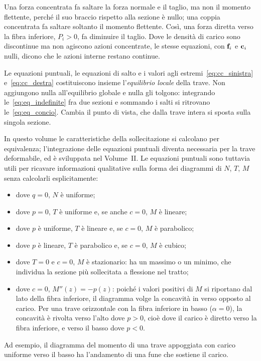 Una forza concentrata fa saltare la forza normale e il
taglio, ma non il momento flettente, perché il suo
braccio rispetto alla sezione è nullo; una coppia
concentrata fa saltare soltanto il momento flettente.
Così, una forza diretta verso la fibra inferiore,
$P_i > 0$, fa diminuire il taglio. Dove le densità di
carico sono discontinue ma non agiscono azioni
concentrate, le stesse equazioni, con $\mathbf{f}_i$ e $\mathbf{c}_i$
nulli, dicono che le azioni interne restano continue.



Le equazioni puntuali, le equazioni di salto e i
valori agli estremi~\eqref{eq:cc_sinistra}
e~\eqref{eq:cc_destra} costituiscono insieme
l'\emph{equilibrio locale} della trave. Non aggiungono
nulla all'equilibrio globale e nulla gli tolgono:
integrando le~\eqref{eq:eq_indefinite} fra due sezioni
e sommando i salti si ritrovano le~\eqref{eq:eq_concio}.
Cambia il punto di vista, che dalla trave intera si
sposta sulla singola sezione.

In questo volume le caratteristiche della sollecitazione
si calcolano per equivalenza; l'integrazione delle
equazioni puntuali diventa necessaria per la trave
deformabile, ed è sviluppata nel Volume~II. Le equazioni
puntuali sono tuttavia utili per ricavare informazioni
qualitative sulla forma dei diagrammi di $N$, $T$, $M$
senza calcolarli esplicitamente:
\begin{itemize}[nosep]
	\item dove $q = 0$, $N$ è uniforme;
	\item dove $p = 0$, $T$ è uniforme e, se anche $c = 0$,
	$M$ è lineare;
	\item dove $p$ è uniforme, $T$ è lineare e, se $c = 0$,
	$M$ è parabolico;
	\item dove $p$ è lineare, $T$ è parabolico e, se $c = 0$,
	$M$ è cubico;
	\item dove $T = 0$ e $c = 0$, $M$ è stazionario: ha un
	massimo o un minimo, che individua la sezione più
	sollecitata a flessione nel tratto;
	\item dove $c = 0$, $M''(z) = -p(z)$: poiché i valori
	positivi di $M$ si riportano dal lato della fibra
	inferiore, il diagramma volge la concavità in verso
	opposto al carico. Per una trave orizzontale con la
	fibra inferiore in basso ($\alpha = 0$), la concavità è
	rivolta verso l'alto dove $p > 0$, cioè dove il carico
	è diretto verso la fibra inferiore, e verso il basso
	dove $p < 0$.
\end{itemize}
Ad esempio, il diagramma del momento di una trave
appoggiata con carico uniforme verso il basso ha
l'andamento di una fune che sostiene il carico.



